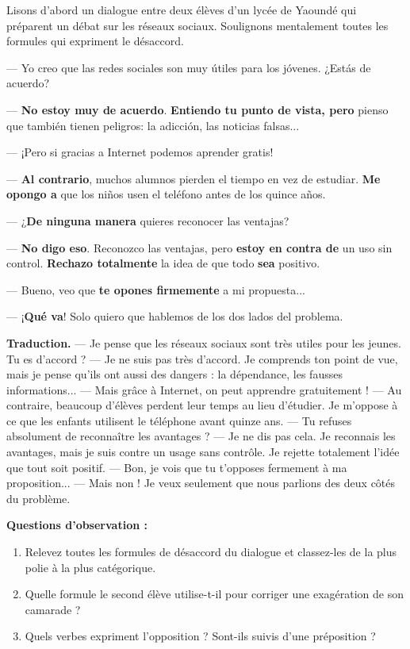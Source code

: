 \documentclass[11pt]{article}
\newcounter{popsec}
\newcounter{popsub}
\newcommand{\courssub}[1]{%
  \stepcounter{popsub}%
  \par\vspace{9pt}\noindent{\popxbold\fontsize{11.5}{13}\selectfont\color{popink}{\color{poporange}\thepopsec.\thepopsub}\hspace{6pt}#1}\par\nopagebreak\vspace{4pt}
}
\begin{document}
\courssub{Observation : le désaccord en contexte}

Lisons d'abord un dialogue entre deux élèves d'un lycée de Yaoundé qui préparent un débat sur les réseaux sociaux. Soulignons mentalement toutes les formules qui expriment le désaccord.

\begin{textebox}
— Yo creo que las redes sociales son muy útiles para los jóvenes. ¿Estás de acuerdo?

— \textbf{No estoy muy de acuerdo}. \textbf{Entiendo tu punto de vista, pero} pienso que también tienen peligros: la adicción, las noticias falsas...

— ¡Pero si gracias a Internet podemos aprender gratis!

— \textbf{Al contrario}, muchos alumnos pierden el tiempo en vez de estudiar. \textbf{Me opongo a} que los niños usen el teléfono antes de los quince años.

— ¿\textbf{De ninguna manera} quieres reconocer las ventajas?

— \textbf{No digo eso}. Reconozco las ventajas, pero \textbf{estoy en contra de} un uso sin control. \textbf{Rechazo totalmente} la idea de que todo \textbf{sea} positivo.

— Bueno, veo que \textbf{te opones firmemente} a mi propuesta...

— ¡\textbf{Qué va}! Solo quiero que hablemos de los dos lados del problema.
\end{textebox}

\textbf{Traduction.} — Je pense que les réseaux sociaux sont très utiles pour les jeunes. Tu es d'accord ? — Je ne suis pas très d'accord. Je comprends ton point de vue, mais je pense qu'ils ont aussi des dangers : la dépendance, les fausses informations... — Mais grâce à Internet, on peut apprendre gratuitement ! — Au contraire, beaucoup d'élèves perdent leur temps au lieu d'étudier. Je m'oppose à ce que les enfants utilisent le téléphone avant quinze ans. — Tu refuses absolument de reconnaître les avantages ? — Je ne dis pas cela. Je reconnais les avantages, mais je suis contre un usage sans contrôle. Je rejette totalement l'idée que tout soit positif. — Bon, je vois que tu t'opposes fermement à ma proposition... — Mais non ! Je veux seulement que nous parlions des deux côtés du problème.

\textbf{Questions d'observation :}
\begin{enumerate}
\item Relevez toutes les formules de désaccord du dialogue et classez-les de la plus polie à la plus catégorique.
\item Quelle formule le second élève utilise-t-il pour corriger une exagération de son camarade ?
\item Quels verbes expriment l'opposition ? Sont-ils suivis d'une préposition ?
\end{enumerate}
\end{document}
